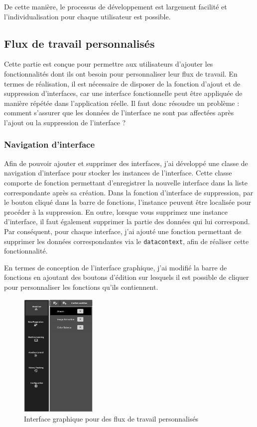 De cette manière, le processus de développement est largement facilité et l'individualisation pour chaque utilisateur est possible.

\subsection{Flux de travail personnalisés}
Cette partie est conçue pour permettre aux utilisateurs d'ajouter les fonctionnalités dont ils ont besoin pour personnaliser leur flux de travail. En termes de réalisation, il est nécessaire de disposer de la fonction d'ajout et de suppression d'interfaces, car une interface fonctionnelle peut être appliquée de manière répétée dans l'application réelle. Il faut donc résoudre un problème : comment s'assurer que les données de l'interface ne sont pas affectées après l'ajout ou la suppression de l'interface ?

\subsubsection{Navigation d'interface}
Afin de pouvoir ajouter et supprimer des interfaces, j'ai développé une classe de navigation d'interface pour stocker les instances de l'interface. Cette classe comporte de fonction permettant d'enregistrer la nouvelle interface dans la liste correspondante après sa création. Dans la fonction d'interface de suppression, par le bouton cliqué dans la barre de fonctions, l'instance peuvent être localisée pour procéder à la suppression. En outre, lorsque vous supprimez une instance d'interface, il faut également supprimer la partie des données qui lui correspond. Par conséquent, pour chaque interface, j'ai ajouté une fonction permettant de supprimer les données correspondantes via le \texttt{datacontext}, afin de réaliser cette fonctionnalité.

En termes de conception de l'interface graphique, j'ai modifié la barre de fonctions en ajoutant des boutons d'édition sur lesquels il est possible de cliquer pour personnaliser les fonctions qu'ils contiennent.

\begin{figure}[H]
    \centering
    \includegraphics[height=6cm]{ressources/images/workflow.png}
    \caption{Interface graphique pour des flux de travail personnalisés}
\end{figure}

